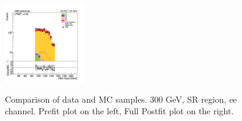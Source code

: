 \begin{figure}[tbp]
\begin{center}
    \includegraphics[width=0.31\textwidth]{figures/ee_300_SR_april21/hmass1_ee_SR_FullPostfit_plot_apr21.png}\\
    \caption{Comparison of data and MC samples. 300 GeV, SR region, ee channel. Prefit plot on the left,           Full Postfit plot on the right.}
    \label{fig:MCcomparisons_ee_low_SR}
  \end{center}
\end{figure}

